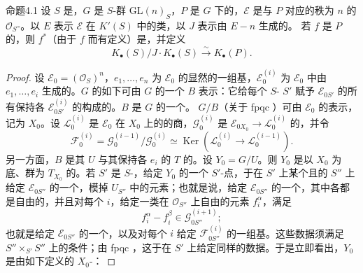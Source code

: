 \begin{SGAresult}{命题}{4.1}
设 $S$ 是，$G$ 是 $S$-群 $\mathrm{GL}(n)_S$，$P$ 是 $G$ 下的，$\mathcal E$ 是与 $P$ 对应的秩为 $n$ 的 $\mathcal O_S$-。以 $E$ 表示 $\mathcal E$ 在 $K'(S)$ 中的类，以 $J$ 表示由 $E-n$ 生成的。
若 $f$ 是 $P$ 的，则 $f^*$（由于 $f$ 而有定义）是，并定义
\[
K_\bullet(S)/J\cdot K_\bullet(S)\xrightarrow{\sim}K_\bullet(P).
\]
\end{SGAresult}
\begin{proof}
设 $\mathcal E_0=(\mathcal O_S)^n$，$e_1,\ldots,e_n$ 为 $\mathcal E_0$ 的显然的一组基，$\mathcal E_0^{(i)}$ 为 $\mathcal E_0$ 中由 $e_1,\ldots,e_i$ 生成的。$G$ 的如下可由 $G$ 的一个 $B$ 表示：它给每个 $S$- $S'$ 赋予 $\mathcal E_{0S'}$ 的所有保持各 $\mathcal E_{0S'}^{(i)}$ 的构成的。$B$ 是 $G$ 的一个。 $G/B$（关于 fpqc ）可由 $\mathcal E_0$ 的表示，记为 $X_0$。设 $\mathcal L_0^{(i)}$ 是 $\mathcal E_0$ 在 $X_0$ 上的的商，$\mathcal G_0^{(i)}$ 是 $\mathcal E_{0X_0}\to\mathcal L_0^{(i)}$ 的，并令
\[
\mathcal F_0^{(i)}=\mathcal G_0^{(i-1)}/\mathcal G_0^{(i)}
\simeq\operatorname{Ker}(\mathcal L_0^{(i)}\longrightarrow\mathcal L_0^{(i-1)}).
\]
另一方面，$B$ 是其 $U$ 与其保持各 $e_i$ 的 $T$ 的。设 $Y_0=G/U$。则 $Y_0$ 是以 $X_0$ 为底、群为 $T_{X_0}$ 的。若 $S'$ 是 $S$-，给定 $Y_0$ 的一个 $S'$-点，于在 $S'$ 上某个且的 $S''$ 上给定 $\mathcal E_{0S''}$ 的一个，模掉 $U_{S''}$ 中的元素；也就是说，给定 $\mathcal E_{0S''}$ 的一个，其中各都是自由的，并且对每个 $i$，给定一类在 $\mathcal O_{S''}$ 上自由的元素 $f_i^\alpha$，满足
\[
f_i^\alpha-f_i^\beta\in\mathcal G_{0S''}^{(i+1)};
\]
也就是给定 $\mathcal E_{0S''}$ 的一个，以及对每个 $i$ 给定 $\mathcal F_{0S''}^{(i)}$ 的一组基。这些数据须满足 $S''\times_{S'}S''$ 上的条件；由 fpqc ，这于在 $S'$ 上给定同样的数据。于是立即看出，$Y_0$ 是由如下定义的 $X_0$-：

\end{proof}

